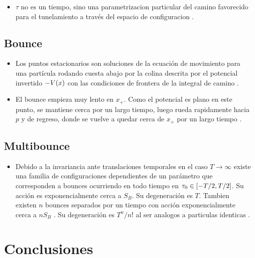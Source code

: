 \documentclass[11pt, a4paper]{article}
\numberwithin{equation}{section}
\theoremstyle{definition}
\begin{document}
\begin{itemize}
\item  $\tau$ no es un tiempo, sino una parametrizacion particular del camino favorecido para el tunelamiento a través del espacio de configuracion \cite{weinberg2012classical}. 
\end{itemize}

\subsection{Bounce}

\begin{itemize}
	
\item Los puntos estacionarios son soluciones de la ecuación de movimiento para una partícula rodando cuesta abajo por la colina descrita por el potencial invertido $-V\qty(x)$	 con las condiciones de frontera de la integral de camino \cite{andreassen2017precision}.

\item El bounce empieza muy lento en $x_+$. Como el potencial es plano en este punto, se mantiene cerca por un largo tiempo, luego rueda rapidamente hacia $p$ y de regreso, donde se vuelve a quedar cerca de $x_+$ por un largo tiempo \cite{andreassen2017precision}. 

\end{itemize}

\subsection{Multibounce}

\begin{itemize}
	
	\item Debido a la invariancia ante translaciones temporales en el caso $T \rightarrow \infty$ existe una familia de configuraciones dependientes de un parámetro que corresponden a bounces ocurriendo en todo tiempo en $\tau_0 \in \qty[-T/2, T/2]$. Su acción es exponencialmente cerca a $S_B$. Su degeneración es $T$. Tambien existen $n$ bounces separados por un tiempo con acción  exponencialmente cerca a $nS_B$ . Su degeneración es $T^n/n!$ al ser analogos a particulas identicas \cite{paranjape2017theory}.
	
\end{itemize}


\section{Conclusiones}
\end{document}
